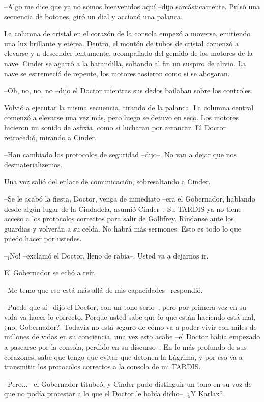 --Algo me dice que ya no somos bienvenidos aquí --dijo sarcásticamente. Pulsó una secuencia de botones, giró un dial y accionó una palanca.

La columna de cristal en el corazón de la consola empezó a moverse, emitiendo una luz brillante y etérea. Dentro, el montón de tubos de cristal comenzó a elevarse y a descender lentamente, acompañado del gemido de los motores de la nave. Cinder se agarró a la barandilla, soltando al fin un suspiro de alivio. La nave se estremeció de repente, los motores tosieron como si se ahogaran.

--Oh, no, no, no --dijo el Doctor mientras sus dedos bailaban sobre los controles.

Volvió a ejecutar la misma secuencia, tirando de la palanca. La columna central comenzó a elevarse una vez más, pero luego se detuvo en seco. Los motores hicieron un sonido de asfixia, como si lucharan por arrancar. El Doctor retrocedió, mirando a Cinder.

--Han cambiado los protocolos de seguridad --dijo--. No van a dejar que nos desmaterializemos.

Una voz salió del enlace de comunicación, sobresaltando a Cinder.

--Se le acabó la fiesta, Doctor, venga de inmediato --era el Gobernador, hablando desde algún lugar de la Ciudadela, asumió Cinder--. Su TARDIS ya no tiene acceso a los protocolos correctos para salir de Gallifrey. Ríndanse ante los guardias y volverán a su celda. No habrá más sermones. Esto es todo lo que puedo hacer por ustedes.

--¡No! --exclamó el Doctor, lleno de rabia--. Usted va a dejarnos ir.

El Gobernador se echó a reír.

--Me temo que eso está más allá de mis capacidades --respondió.

--Puede que sí --dijo el Doctor, con un tono serio--, pero por primera vez en su vida va hacer lo correcto. Porque usted sabe que lo que están haciendo está mal, ¿no, Gobernador?. Todavía no está seguro de cómo va a poder vivir con miles de millones de vidas en su conciencia, una vez esto acabe --el Doctor había empezado a pasearse por la consola, perdido en su discurso--. En lo más profundo de sus corazones, sabe que tengo que evitar que detonen la Lágrima, y por eso va a transmitir los protocolos correctos a la consola de mi TARDIS.

--Pero... --el Gobernador titubeó, y Cinder pudo distinguir un tono en su voz de que no podía protestar a lo que el Doctor le había dicho--. ¿Y Karlax?.

